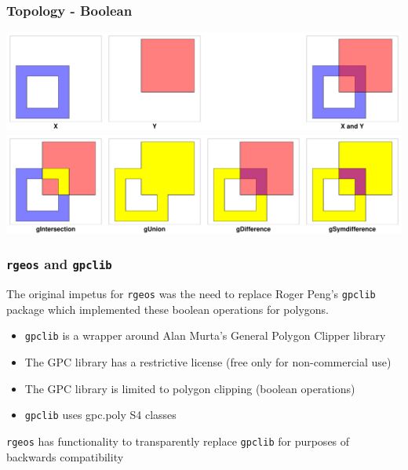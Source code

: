 \documentclass[slidestop,mathserif]{beamer}
\begin{document}
\begin{frame}
\frametitle{Topology - Boolean}

\begin{center}
\includegraphics[width=\textwidth]{Figures/booleans1.pdf} \\
\pause
\includegraphics[width=\textwidth]{Figures/booleans2.pdf} \\
\end{center}

\end{frame}


\begin{frame}
\frametitle{\texttt{rgeos} and \texttt{gpclib}}

The original impetus for \texttt{rgeos} was the need to replace Roger Peng's \texttt{gpclib} package which implemented these boolean operations for polygons.

\begin{itemize}
\item \texttt{gpclib} is a wrapper around Alan Murta's General Polygon Clipper library
\item The GPC library has a restrictive license (free only for non-commercial use)
\item The GPC library is limited to polygon clipping (boolean operations)
\item \texttt{gpclib} uses gpc.poly S4 classes
\end{itemize}
\vspace{3mm}
\texttt{rgeos} has functionality to transparently replace \texttt{gpclib} for purposes of backwards compatibility

\end{frame}

\end{document}
